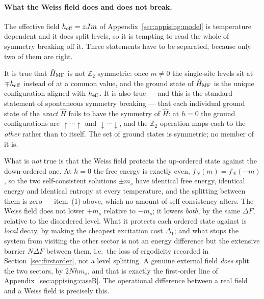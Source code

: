 \documentclass[10pt,a4paper]{article}
\theoremstyle{remark}
\begin{document}
\paragraph{What the Weiss field does and does not break.} The effective field
$h_{\rm eff}=zJm$ of Appendix~\ref{sec:appising:model} is temperature dependent
and it does split levels, so it is tempting to read the whole of symmetry
breaking off it. Three statements have to be separated, because only two of them
are right.

It is true that $\hat H_{\rm MF}$ is not $\mathbb{Z}_2$ symmetric: once $m\neq0$
the single-site levels sit at $\mp h_{\rm eff}$ instead of at a common value, and
the ground state of $\hat H_{\rm MF}$ is the unique configuration aligned with
$h_{\rm eff}$. It is also true --- and this is the standard statement of
spontaneous symmetry breaking --- that each individual ground state of the
\emph{exact} $\hat H$ fails to have the symmetry of $\hat H$: at $h=0$ the ground
configurations are $\uparrow\cdots\uparrow$ and $\downarrow\cdots\downarrow$, and
the $\mathbb{Z}_2$ operation maps each to the \emph{other} rather than to itself.
The set of ground states is symmetric; no member of it is.

What is \emph{not} true is that the Weiss field protects the up-ordered state
against the down-ordered one. At $h=0$ the free energy is exactly even,
$f_N(m)=f_N(-m)$, so the two self-consistent solutions $\pm m_s$ have identical
free energy, identical energy and identical entropy at every temperature, and the
splitting between them is zero --- item~(1) above, which no amount of
self-consistency alters. The Weiss field does not lower $+m_s$ relative to
$-m_s$; it lowers \emph{both}, by the same $\Delta F$, relative to the disordered
level. What it protects each ordered state against is \emph{local} decay, by
making the cheapest excitation cost $\Delta_1$; and what stops the system from
visiting the other sector is not an energy difference but the extensive barrier
$N\Delta F$ between them, i.e.\ the loss of ergodicity recorded in
Section~\ref{sec:firstorder}, not a level splitting. A genuine external field
\emph{does} split the two sectors, by $2Nhm_s$, and that is exactly the
first-order line of Appendix~\ref{sec:appising:caseB}. The operational difference
between a real field and a Weiss field is precisely this.
\end{document}
